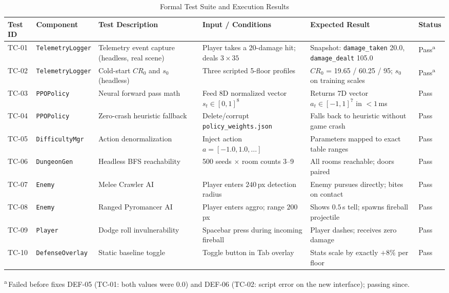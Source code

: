 \begin{table}[!htbp]
\centering
\caption{Formal Test Suite and Execution Results}
\label{tab:test_cases}
\scriptsize
\begin{tabular}{p{}p{}p{}p{}p{}p{}}
\toprule
\textbf{Test ID} & \textbf{Component} & \textbf{Test Description} & \textbf{Input / Conditions} & \textbf{Expected Result} & \textbf{Status} \\
\midrule
TC-01 & \texttt{TelemetryLogger} & Telemetry event capture (headless, real scene) & Player takes a 20-damage hit; deals $3\times35$ & Snapshot: \texttt{damage\_taken} 20.0, \texttt{damage\_dealt} 105.0 & Pass\textsuperscript{a} \\
TC-02 & \texttt{TelemetryLogger} & Cold-start $CR_0$ and $s_0$ (headless) & Three scripted 5-floor profiles & $CR_0$ = 19.65 / 60.25 / 95; $s_0$ on training scales & Pass\textsuperscript{a} \\
TC-03 & \texttt{PPOPolicy} & Neural forward pass math & Feed 8D normalized vector $s_t \in [0, 1]^8$ & Returns 7D vector $a_t \in [-1, 1]^7$ in $<1$\,ms & Pass \\
TC-04 & \texttt{PPOPolicy} & Zero-crash heuristic fallback & Delete/corrupt \texttt{policy\_weights.json} & Falls back to heuristic without game crash & Pass \\
TC-05 & \texttt{DifficultyMgr} & Action denormalization & Inject action $a = [-1.0, 1.0, \dots]$ & Parameters mapped to exact table ranges & Pass \\
TC-06 & \texttt{DungeonGen} & Headless BFS reachability & 500 seeds $\times$ room counts 3--9 & All rooms reachable; doors paired & Pass \\
TC-07 & \texttt{Enemy} & Melee Crawler AI & Player enters $240$\,px detection radius & Enemy pursues directly; bites on contact & Pass \\
TC-08 & \texttt{Enemy} & Ranged Pyromancer AI & Player enters aggro; range $200$\,px & Shows $0.5$\,s tell; spawns fireball projectile & Pass \\
TC-09 & \texttt{Player} & Dodge roll invulnerability & Spacebar press during incoming fireball & Player dashes; receives zero damage & Pass \\
TC-10 & \texttt{DefenseOverlay} & Static baseline toggle & Toggle button in Tab overlay & Stats scale by exactly $+8\%$ per floor & Pass \\
\bottomrule
\end{tabular}

\smallskip\footnotesize\textsuperscript{a}\,Failed before fixes DEF-05 (TC-01: both values were 0.0) and DEF-06 (TC-02: script error on the new interface); passing since.
\end{table}

